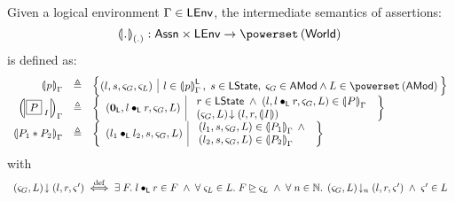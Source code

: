 %
%
\begin{definition}
Given a logical environment $\Gamma \in \textsf{LEnv}$, the intermediate semantics of assertions: 
%
\[
	\intermediateSem[\blankArg]{.}  :  \Assertions \times \LEnv \rightarrow \pset{\Worlds}\\
\]
%
is defined as: 
%
\[
\begin{array}{r c l}
	\intermediateSem{p} & \eqdef & 
	\left\{
	\hspace*{-0.15cm}
	\begin{array}{l | l}
	 \left( l, s, \amod{G}, \amod{L} \right) &
	 		l \in \semL{p},\; s \in \LState,\; \amod{G} \in \AMods \land L \in \pset{\AMods}
	\end{array}
	\hspace*{-0.1cm}
	\right\}\\
	
	
	\intermediateSem{\shared{P}{I}} & \eqdef & 
	\left\{ 
	\begin{array}{l | l}
		(\unitL, l \composeL r, \amod{G}, L) & 
		\begin{array}{l}
			r \in \LState \;\land\; (l, l \composeL r, \amod{G}, L) \in \intermediateSem{P} \\
			\extendsAM{\amod{G}, L}{l}{r}{\intermediateSemI{I} }
	
		\end{array}
	\end{array} \right\}\\
	
	
	\intermediateSem{P_1 * P_2} & \eqdef & 
	\left\{ 
	\begin{array}{l | l}
		(l_1 \composeL l_2, s, \amod{G}, L)& 
		\begin{array}{l}
				 (l_1, s, \amod{G}, L) \in \intermediateSem{P_1} \;\land\\
				 (l_2, s, \amod{G}, L) \in \intermediateSem{P_2} 
		\end{array}
	\end{array} 
	\right\}
\end{array}
\]
%
with
%
\[
\begin{array}{l}
	\left(\varsigma_{G}, L\right) \!\downarrow \left(l, r, \varsigma_{}'\right) \stackrel{\mathrm{def}}{\iff} \exists\; F.\; l \bullet_{\textsf{L}} r \in F \;\land\; \forall\; \varsigma_{L} \in L.\; F \unrhd \varsigma_{L}  \;\land\; \forall\; n \in \mathbb{N}.\; \left(\varsigma_{G}, L\right) \!\downarrow_{n} \left(l, r, \varsigma_{}'\right)  \;\land\; \varsigma_{}' \in L\\\\ 
	

\end{array}\]
\end{definition}
